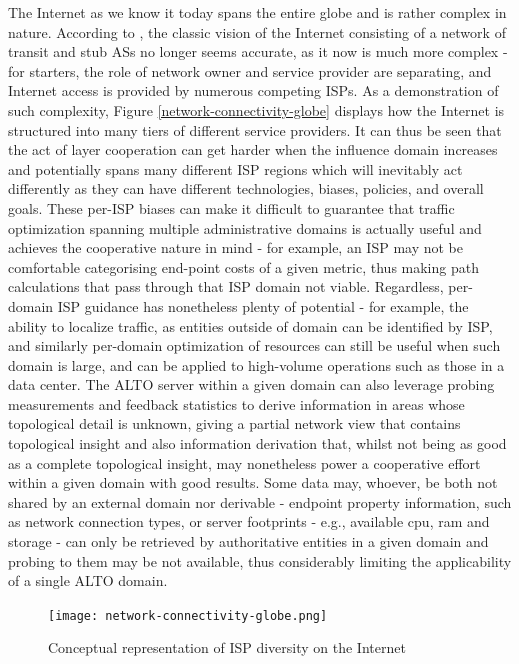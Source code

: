     The Internet as we know it today spans the entire globe and is rather complex in nature.
    According to \cite{dan-Commag10}, the classic vision of the Internet consisting of a network of transit and stub ASs no longer seems accurate, as it now is much more complex - for starters, the role of network owner and service provider are separating, and Internet access is provided by numerous competing ISPs.
    As a demonstration of such complexity, Figure \ref{network-connectivity-globe} displays how the Internet is structured into many tiers of different service providers.
    It can thus be seen that the act of layer cooperation can get harder when the influence domain increases and potentially spans many different ISP regions which will inevitably act differently as they can have different technologies, biases, policies, and overall goals.
    These per-ISP biases can make it difficult to guarantee that traffic optimization spanning multiple administrative domains is actually useful and achieves the cooperative nature in mind - for example, an ISP may not be comfortable categorising end-point costs of a given metric, thus making path calculations that pass through that ISP domain not viable.
    Regardless, per-domain ISP guidance has nonetheless plenty of potential - for example, the ability to localize traffic, as entities outside of domain can be identified by ISP, and similarly per-domain optimization of resources can still be useful when such domain is large, and can be applied to high-volume operations such as those in a data center.
    The ALTO server within a given domain can also leverage probing measurements and feedback statistics to derive information in areas whose topological detail is unknown, giving a partial network view that contains topological insight and also information derivation that, whilst not being as good as a complete topological insight, may nonetheless power a cooperative effort within a given domain with good results.
    Some data may, whoever, be both not shared by an external domain nor derivable - endpoint property information, such as network connection types, or server footprints - e.g., available cpu, ram and storage - can only be retrieved by authoritative entities in a given domain and probing to them may be not available, thus considerably limiting the applicability of a single ALTO domain.

    \begin{figure}[ht]
    \centering
    \texttt{[image: network-connectivity-globe.png]}
    \caption{Conceptual representation of ISP diversity on the Internet}
    \label{fig:network-connectivity-globe}
    \end{figure}

